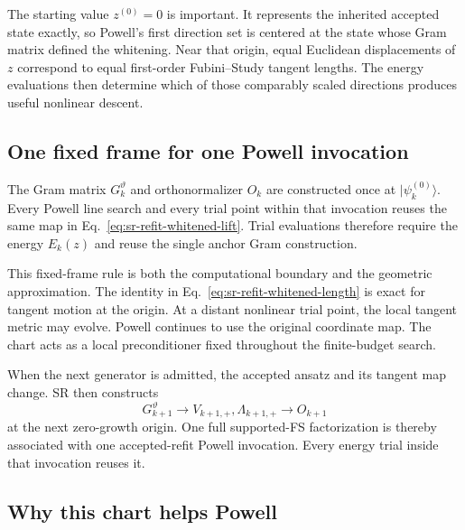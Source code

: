 \documentclass[10pt,twocolumn]{article}
\newcommand{\ket}[1]{\lvert #1\rangle}
\begin{document}
The starting value \(z^{(0)}=0\) is important. It represents the inherited
accepted state exactly, so Powell's first direction set is centered at the
state whose Gram matrix defined the whitening. Near that origin, equal
Euclidean displacements of \(z\) correspond to equal first-order
Fubini--Study tangent lengths. The energy evaluations then determine which of
those comparably scaled directions produces useful nonlinear descent.

\subsection*{One fixed frame for one Powell invocation}

The Gram matrix \(G_k^{\vartheta}\) and orthonormalizer \(O_k\) are constructed
once at \(\ket{\psi_k^{(0)}}\). Every Powell line search and every trial point
within that invocation reuses the same map in
Eq.~\eqref{eq:sr-refit-whitened-lift}. Trial evaluations therefore require the
energy \(E_k(z)\) and reuse the single anchor Gram construction.

This fixed-frame rule is both the computational boundary and the geometric
approximation. The identity in Eq.~\eqref{eq:sr-refit-whitened-length} is exact
for tangent motion at the origin. At a distant nonlinear trial point, the
local tangent metric may evolve. Powell continues to use the original
coordinate map. The chart acts as a local preconditioner fixed throughout the
finite-budget search.

When the next generator is admitted, the accepted ansatz and its tangent map
change. SR then constructs
\begin{equation}
G_{k+1}^{\vartheta}
\longrightarrow
V_{k+1,+},\Lambda_{k+1,+}
\longrightarrow
O_{k+1}
\label{eq:sr-refit-next-frame}
\end{equation}
at the next zero-growth origin. One full supported-FS factorization is thereby
associated with one accepted-refit Powell invocation. Every energy trial inside
that invocation reuses it.

\subsection*{Why this chart helps Powell}
\end{document}
